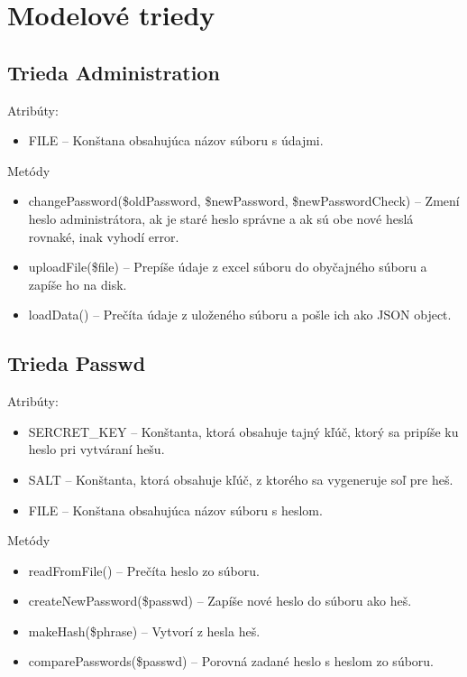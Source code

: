 \documentclass[12pt,a4paper]{report}
\begin{document}
\section[Modelové triedy]{\rmfamily\bfseries
	Modelové triedy}

\subsection[Trieda Administration]{\rmfamily\bfseries
	Trieda Administration}
Atribúty:
\begin{itemize}
		\item FILE – Konštana obsahujúca názov súboru s údajmi. 
\end{itemize}
Metódy
\begin{itemize}
	\item changePassword(\$oldPassword, \$newPassword, \$newPasswordCheck) – Zmení heslo administrátora, ak je staré heslo správne a ak sú obe nové heslá rovnaké, inak vyhodí error.
	\item uploadFile(\$file) – Prepíše údaje z excel súboru do obyčajného súboru a zapíše ho na disk.
	\item loadData() – Prečíta údaje z uloženého súboru a pošle ich ako JSON object.
\end{itemize}

\subsection[Trieda Passwd]{\rmfamily\bfseries
	Trieda Passwd}
Atribúty:
\begin{itemize}
	\item SERCRET\_KEY – Konštanta, ktorá obsahuje tajný kľúč, ktorý sa pripíše ku heslo pri vytváraní hešu. 
	\item SALT – Konštanta, ktorá obsahuje kľúč, z ktorého sa vygeneruje soľ pre heš.
	\item FILE – Konštana obsahujúca názov súboru s heslom.
\end{itemize}
Metódy
\begin{itemize}
	\item readFromFile() – Prečíta heslo zo súboru.
	\item createNewPassword(\$passwd) – Zapíše nové heslo do súboru ako heš.
	\item makeHash(\$phrase) – Vytvorí z hesla heš.
	\item comparePasswords(\$passwd) – Porovná zadané heslo s heslom zo súboru.
\end{itemize}
\end{document}
